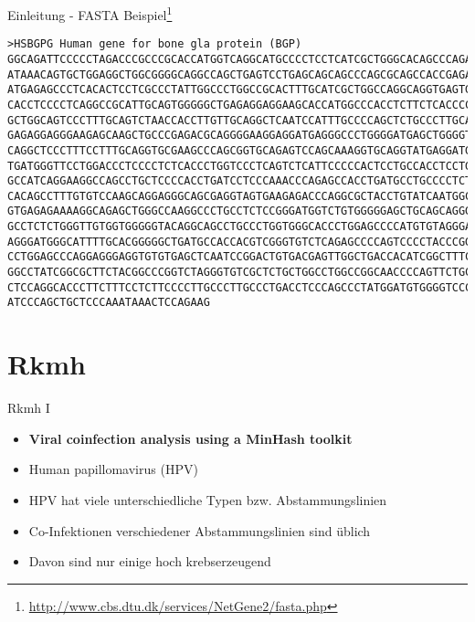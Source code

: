 \begin{frame}[fragile]{Einleitung - FASTA Beispiel\footnote{\url{http://www.cbs.dtu.dk/services/NetGene2/fasta.php}}}
    \begin{verbatim}
>HSBGPG Human gene for bone gla protein (BGP)
GGCAGATTCCCCCTAGACCCGCCCGCACCATGGTCAGGCATGCCCCTCCTCATCGCTGGGCACAGCCCAGAGGGT
ATAAACAGTGCTGGAGGCTGGCGGGGCAGGCCAGCTGAGTCCTGAGCAGCAGCCCAGCGCAGCCACCGAGACACC
ATGAGAGCCCTCACACTCCTCGCCCTATTGGCCCTGGCCGCACTTTGCATCGCTGGCCAGGCAGGTGAGTGCCCC
CACCTCCCCTCAGGCCGCATTGCAGTGGGGGCTGAGAGGAGGAAGCACCATGGCCCACCTCTTCTCACCCCTTTG
GCTGGCAGTCCCTTTGCAGTCTAACCACCTTGTTGCAGGCTCAATCCATTTGCCCCAGCTCTGCCCTTGCAGAGG
GAGAGGAGGGAAGAGCAAGCTGCCCGAGACGCAGGGGAAGGAGGATGAGGGCCCTGGGGATGAGCTGGGGTGAAC
CAGGCTCCCTTTCCTTTGCAGGTGCGAAGCCCAGCGGTGCAGAGTCCAGCAAAGGTGCAGGTATGAGGATGGACC
TGATGGGTTCCTGGACCCTCCCCTCTCACCCTGGTCCCTCAGTCTCATTCCCCCACTCCTGCCACCTCCTGTCTG
GCCATCAGGAAGGCCAGCCTGCTCCCCACCTGATCCTCCCAAACCCAGAGCCACCTGATGCCTGCCCCTCTGCTC
CACAGCCTTTGTGTCCAAGCAGGAGGGCAGCGAGGTAGTGAAGAGACCCAGGCGCTACCTGTATCAATGGCTGGG
GTGAGAGAAAAGGCAGAGCTGGGCCAAGGCCCTGCCTCTCCGGGATGGTCTGTGGGGGAGCTGCAGCAGGGAGTG
GCCTCTCTGGGTTGTGGTGGGGGTACAGGCAGCCTGCCCTGGTGGGCACCCTGGAGCCCCATGTGTAGGGAGAGG
AGGGATGGGCATTTTGCACGGGGGCTGATGCCACCACGTCGGGTGTCTCAGAGCCCCAGTCCCCTACCCGGATCC
CCTGGAGCCCAGGAGGGAGGTGTGTGAGCTCAATCCGGACTGTGACGAGTTGGCTGACCACATCGGCTTTCAGGA
GGCCTATCGGCGCTTCTACGGCCCGGTCTAGGGTGTCGCTCTGCTGGCCTGGCCGGCAACCCCAGTTCTGCTCCT
CTCCAGGCACCCTTCTTTCCTCTTCCCCTTGCCCTTGCCCTGACCTCCCAGCCCTATGGATGTGGGGTCCCCATC
ATCCCAGCTGCTCCCAAATAAACTCCAGAAG
    \end{verbatim}
\end{frame}

\section{Rkmh}

\begin{frame}{Rkmh I}
    \begin{itemize}
        \item \textbf{Viral coinfection analysis using a MinHash toolkit \cite{rkmh}} \pause
        \item Human papillomavirus (HPV) \pause
        \item HPV hat viele unterschiedliche Typen bzw. Abstammungslinien \pause
        \item Co-Infektionen verschiedener Abstammungslinien sind üblich \pause
        \item Davon sind nur einige hoch krebserzeugend
    \end{itemize}
\end{frame}

